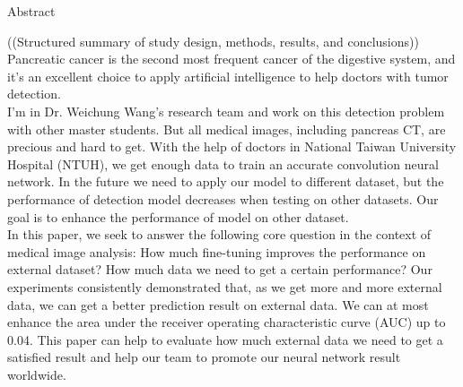 


\doublespacing

\begin{center}
\Large{{Abstract}}\\
\end{center}
((Structured summary of study design, methods, results, and conclusions))\\
Pancreatic  cancer  is  the  second  most  frequent  cancer  of  the digestive  system, and it's an excellent choice to apply artificial intelligence to help doctors with tumor detection. \\
I'm in Dr. Weichung Wang's research team and work on this detection problem with other master students. But all medical images, including pancreas CT, are precious and hard to get. With the help of doctors in National Taiwan University Hospital  (NTUH), we get enough data to  train an accurate convolution neural network. In the future we need to apply our model to different dataset, but the performance of detection model decreases when testing on other datasets. Our goal is to enhance the performance of model on other dataset. \\
In this paper, we seek to answer the following core question in the context of medical image analysis: How much fine-tuning improves the performance on external dataset? How much data we need to get a certain performance? Our experiments consistently demonstrated that, as we get more and more external data, we can get a better prediction result on external data. We can at most enhance the area under the receiver operating characteristic curve (AUC) up to 0.04. This paper can help to evaluate how much external data we need to get a satisfied result and help our team to promote our neural network result worldwide.

